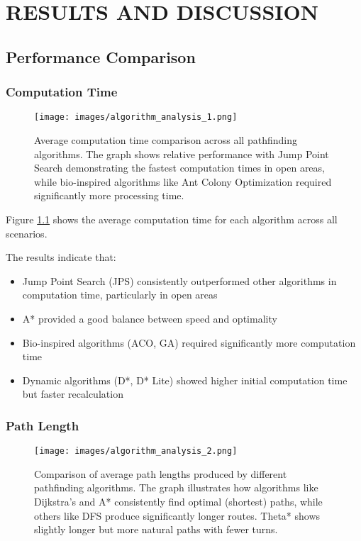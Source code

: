 \documentclass[11pt,a4paper]{report}
\begin{document}
\chapter{RESULTS AND DISCUSSION}

\section{Performance Comparison}

\subsection{Computation Time}
\begin{figure}[H]
    \centering
    \texttt{[image: images/algorithm\_analysis\_1.png]}
    \caption{Average computation time comparison across all pathfinding algorithms. The graph shows relative performance with Jump Point Search demonstrating the fastest computation times in open areas, while bio-inspired algorithms like Ant Colony Optimization required significantly more processing time.}
    \label{fig:computation_time}
\end{figure}

Figure \ref{fig:computation_time} shows the average computation time for each algorithm across all scenarios.

The results indicate that:
\begin{itemize}
    \item Jump Point Search (JPS) consistently outperformed other algorithms in computation time, particularly in open areas
    \item A* provided a good balance between speed and optimality
    \item Bio-inspired algorithms (ACO, GA) required significantly more computation time
    \item Dynamic algorithms (D*, D* Lite) showed higher initial computation time but faster recalculation
\end{itemize}

\subsection{Path Length}
\begin{figure}[H]
    \centering
    \texttt{[image: images/algorithm\_analysis\_2.png]}
    \caption{Comparison of average path lengths produced by different pathfinding algorithms. The graph illustrates how algorithms like Dijkstra's and A* consistently find optimal (shortest) paths, while others like DFS produce significantly longer routes. Theta* shows slightly longer but more natural paths with fewer turns.}
    \label{fig:path_length}
\end{figure}
\end{document}
